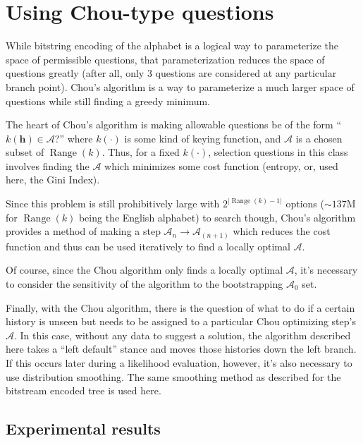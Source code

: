 \documentclass[12pt]{article}
\DeclareMathOperator*{\Range}{Range}
\begin{document}
\section{Using Chou-type questions}

While bitstring encoding of the alphabet is a logical way to
parameterize the space of permissible questions, that parameterization
reduces the space of questions greatly (after all, only 3 questions
are considered at any particular branch point). Chou's algorithm is a
way to parameterize a much larger space of questions while still
finding a greedy minimum.

The heart of Chou's algorithm is making allowable questions be of the
form ``$k(\mathbf{h}) \in \mathcal{A}$?'' where $k(\cdot)$ is some kind
of keying function, and $\mathcal{A}$ is a chosen subset of
$\Range(k)$. Thus, for a fixed $k(\cdot)$, selection questions in this
class involves finding the $\mathcal{A}$ which minimizes some cost
function (entropy, or, used here, the Gini Index).

Since this problem is still prohibitively large with
$2^{|\Range(k)-1|}$ options ($\sim 137$M for $\Range(k)$ being the
English alphabet) to search though, Chou's algorithm provides a method
of making a step $\mathcal{A}_{n} \to \mathcal{A}_{(n+1)}$ which
reduces the cost function and thus can be used iteratively to find a
locally optimal $\mathcal{A}$.

Of course, since the Chou algorithm only finds a locally optimal
$\mathcal{A}$, it's necessary to consider the sensitivity of the
algorithm to the bootstrapping $\mathcal{A}_0$ set.

Finally, with the Chou algorithm, there is the question of what to do
if a certain history is unseen but needs to be assigned to a
particular Chou optimizing step's $\mathcal{A}$. In this case, without
any data to suggest a solution, the algorithm described here takes a
``left default'' stance and moves those histories down the left
branch. If this occurs later during a likelihood evaluation, however,
it's also necessary to use distribution smoothing. The same smoothing
method as described for the bitstream encoded tree is used here.

\subsection{Experimental results}
\end{document}
